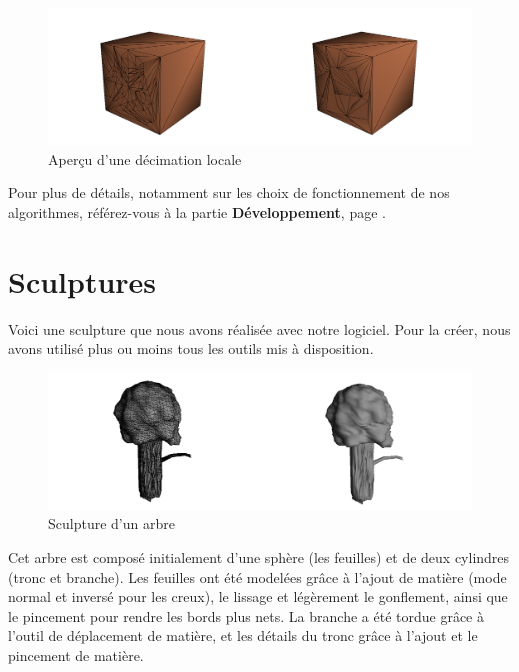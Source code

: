 \documentclass[a4paper]{memoir}
\begin{document}
			\begin{figure}[H]
				\vspace{-0,5cm} \hspace{-2cm} \includegraphics[scale=0.27]{img/l-dec.png}
				\caption{Aperçu d'une décimation locale}
			\end{figure}
			Pour plus de détails, notamment sur les choix de fonctionnement de nos algorithmes, référez-vous à la partie \textbf{Développement}, page 
			\pageref{processing-dev}.
			
		\section{Sculptures}
			Voici une sculpture que nous avons réalisée avec notre logiciel. Pour la créer, nous avons utilisé plus ou moins tous les outils mis à 
			disposition.
			\begin{figure}[H]
				\hspace{-2cm} \includegraphics[scale=0.27]{img/result1.png}
				\caption{Sculpture d'un arbre}
			\end{figure}
			Cet arbre est composé initialement d'une sphère (les feuilles) et de deux cylindres (tronc et branche). Les feuilles ont été modelées grâce à 
			l'ajout de matière (mode normal et inversé pour les creux), le lissage et légèrement le gonflement, ainsi que le pincement pour rendre les bords 
			plus nets. La branche a été tordue grâce à l'outil de déplacement de matière, et les détails du tronc grâce à l'ajout et le pincement de matière.

\end{document}

